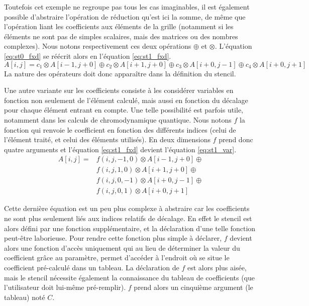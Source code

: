 Toutefois cet exemple ne regroupe pas tous les cas imaginables, il est également possible d'abstraire l'opération de réduction qu'est ici la somme, de même que l'opération liant les coefficients aux éléments de la grille (notamment si les éléments ne sont pas de simples scalaires, mais des matrices ou des nombres complexes). Nous notons respectivement ces deux opérations $\oplus$ et $\otimes$. L'équation \ref{eq:st0_fxd} se réécrit alors en l'équation \ref{eq:st1_fxd}.
\begin{equation}
\label{eq:st1_fxd}
A[i,j] = c_1 \otimes A[i-1,j+0] \oplus c_2 \otimes A[i+1,j+0] \oplus c_3 \otimes A[i+0,j-1] \oplus c_4 \otimes A[i+0,j+1]
\end{equation}
La nature des opérateurs doit donc apparaître dans la définition du stencil.

Une autre variante sur les coefficients consiste à les considérer variables en fonction non seulement de l'élément calculé, mais aussi en fonction du décalage pour chaque élément entrant en compte. Une telle possibilité est parfois utile, notamment dans les calculs de chromodynamique quantique. Nous notons $f$ la fonction qui renvoie le coefficient en fonction des différents indices (celui de l'élément traité, et celui des éléments utilisés). En deux dimensions $f$ prend donc quatre arguments et l'équation \ref{eq:st1_fxd} devient l'équation \ref{eq:st1_var}.
\begin{equation}
\label{eq:st1_var}
\begin{aligned}
A[i,j] = & f(i, j, -1,  0) \otimes A[i-1,j+0] \oplus \\
         & f(i, j,  1,  0) \otimes A[i+1,j+0] \oplus \\
         & f(i, j,  0, -1) \otimes A[i+0,j-1] \oplus \\ 
         & f(i, j,  0,  1) \otimes A[i+0,j+1]
\end{aligned}
\end{equation}

Cette dernière équation est un peu plus complexe à abstraire car les coefficients ne sont plus seulement liés aux indices relatifs de décalage. En effet le stencil est alors défini par une fonction supplémentaire, et la déclaration d'une telle fonction peut-être laborieuse. Pour rendre cette fonction plus simple à déclarer, $f$ devient alors une fonction d'accès uniquement qui au lieu de déterminer la valeur du coefficient grâce au paramètre, permet d'accéder à l'endroit où se situe le coefficient pré-calculé dans un tableau. La déclaration de $f$ est alors plus aisée, mais le stencil nécessite également la connaissance du tableau de coefficients (que l'utilisateur doit lui-même pré-remplir). $f$ prend alors un cinquième argument (le tableau) noté $C$.


